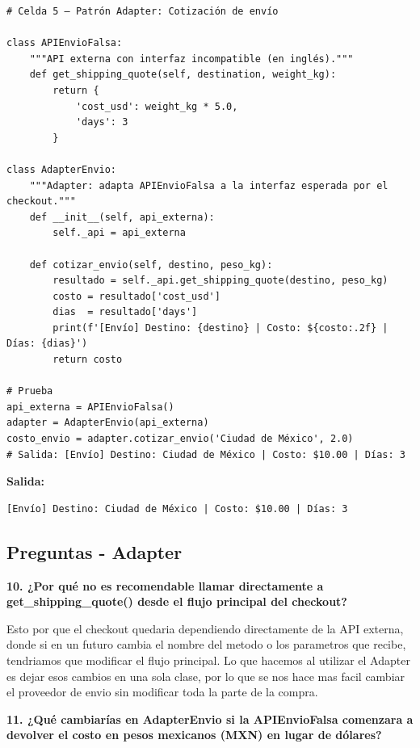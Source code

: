 \documentclass[letterpaper,11pt]{article}
\begin{document}
\begin{lstlisting}[style=pythonreport]
# Celda 5 – Patrón Adapter: Cotización de envío

class APIEnvioFalsa:
    """API externa con interfaz incompatible (en inglés)."""
    def get_shipping_quote(self, destination, weight_kg):
        return {
            'cost_usd': weight_kg * 5.0,
            'days': 3
        }

class AdapterEnvio:
    """Adapter: adapta APIEnvioFalsa a la interfaz esperada por el checkout."""
    def __init__(self, api_externa):
        self._api = api_externa

    def cotizar_envio(self, destino, peso_kg):
        resultado = self._api.get_shipping_quote(destino, peso_kg)
        costo = resultado['cost_usd']
        dias  = resultado['days']
        print(f'[Envío] Destino: {destino} | Costo: ${costo:.2f} | Días: {dias}')
        return costo

# Prueba
api_externa = APIEnvioFalsa()
adapter = AdapterEnvio(api_externa)
costo_envio = adapter.cotizar_envio('Ciudad de México', 2.0)
# Salida: [Envío] Destino: Ciudad de México | Costo: $10.00 | Días: 3
\end{lstlisting}
\par\noindent\textbf{Salida:}
\begin{lstlisting}[style=reportoutput,language={}]
[Envío] Destino: Ciudad de México | Costo: $10.00 | Días: 3
\end{lstlisting}

\subsection*{Preguntas - Adapter}

\textbf{10. ¿Por qué no es recomendable llamar directamente a get\_shipping\_quote() desde el flujo principal del checkout?}

Esto por que el checkout quedaria dependiendo directamente de la API externa, donde si en un futuro cambia el nombre del metodo o los parametros que recibe, tendriamos que modificar el flujo principal. Lo que hacemos al utilizar el Adapter es dejar esos cambios en una sola clase, por lo que se nos hace mas facil cambiar el proveedor de envio sin modificar toda la parte de la compra.

\textbf{11. ¿Qué cambiarías en AdapterEnvio si la APIEnvioFalsa comenzara a devolver el costo en pesos mexicanos (MXN) en lugar de dólares?}
\end{document}
